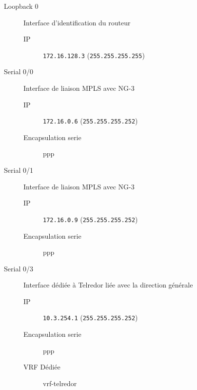 	\begin{description}
		\item[Loopback 0] Interface d'identification du routeur
		\begin{description}
			\item[IP] \texttt{172.16.128.3} (\texttt{255.255.255.255})
		\end{description}

		\item[Serial 0/0] Interface de liaison MPLS avec NG-3
		\begin{description}
			\item[IP] \texttt{172.16.0.6} (\texttt{255.255.255.252})
			\item[Encapsulation serie] ppp
		\end{description}

		\item[Serial 0/1] Interface de liaison MPLS avec NG-3
		\begin{description}
			\item[IP] \texttt{172.16.0.9} (\texttt{255.255.255.252})
			\item[Encapsulation serie] ppp
		\end{description}

		\item[Serial 0/3] Interface dédiée à Telredor liée avec la direction générale
		\begin{description}
			\item[IP] \texttt{10.3.254.1} (\texttt{255.255.255.252})
			\item[Encapsulation serie] ppp
			\item[VRF Dédiée] vrf-telredor
		\end{description}

	\end{description}
